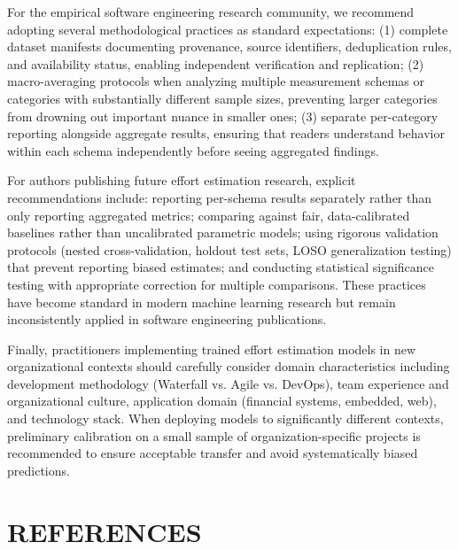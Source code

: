\documentclass[11pt,a4paper]{article}
\begin{document}
For the empirical software engineering research community, we recommend adopting several methodological practices as standard expectations: (1) complete dataset manifests documenting provenance, source identifiers, deduplication rules, and availability status, enabling independent verification and replication; (2) macro-averaging protocols when analyzing multiple measurement schemas or categories with substantially different sample sizes, preventing larger categories from drowning out important nuance in smaller ones; (3) separate per-category reporting alongside aggregate results, ensuring that readers understand behavior within each schema independently before seeing aggregated findings.

For authors publishing future effort estimation research, explicit recommendations include: reporting per-schema results separately rather than only reporting aggregated metrics; comparing against fair, data-calibrated baselines rather than uncalibrated parametric models; using rigorous validation protocols (nested cross-validation, holdout test sets, LOSO generalization testing) that prevent reporting biased estimates; and conducting statistical significance testing with appropriate correction for multiple comparisons. These practices have become standard in modern machine learning research but remain inconsistently applied in software engineering publications.

Finally, practitioners implementing trained effort estimation models in new organizational contexts should carefully consider domain characteristics including development methodology (Waterfall vs. Agile vs. DevOps), team experience and organizational culture, application domain (financial systems, embedded, web), and technology stack. When deploying models to significantly different contexts, preliminary calibration on a small sample of organization-specific projects is recommended to ensure acceptable transfer and avoid systematically biased predictions.

\newpage

\section*{REFERENCES}
\end{document}
